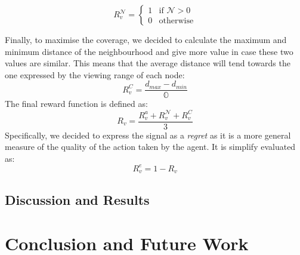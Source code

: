 \documentclass[conference]{IEEEtran}
\begin{document}
 \begin{equation*}
 R^{\mathcal{N}}_{v} = \begin{cases}
  1 & \text{if } \mathcal{N} > 0 \\
  0 & \text{otherwise} 
 \end{cases}
 \end{equation*}
 
 Finally, to maximise the coverage, 
  we decided to calculate the maximum and minimum distance of the neighbourhood and give more value in case these two values are similar. 
%
This means that the average distance will tend towards the one expressed by the viewing range of each node:
% 
\begin{equation*}
R^{C}_{v} = \frac{d_{max} - d_{min}}{\mathbb{O}}
\end{equation*}
The final reward function is defined as:
\begin{equation*}
R_{v} = \frac{R^a_{v} + R^{\mathcal{N}}_{v} + R^{C}_{v}}{3}
\end{equation*}
Specifically, we decided to express the signal as a \emph{regret}
  as it is a more general measure of the quality of the action taken by the agent.
It is simplify evaluated as:
\begin{equation*}
R^e_{v} = 1 - R_v
\end{equation*}
%


\subsection{Discussion and Results}
\section{Conclusion and Future Work}
\label{sec:conclusion}



\end{document}
